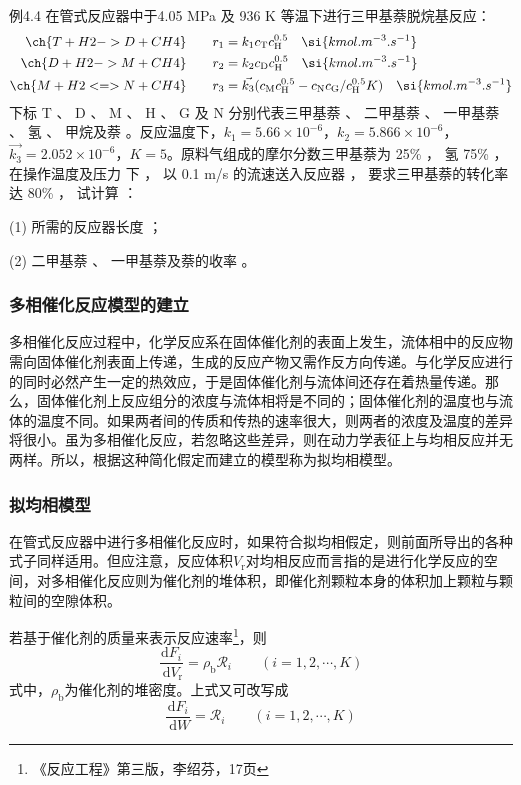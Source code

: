 \documentclass[dvipsnames, svgnames, x11names]{beamer}
\begin{document}
\begin{frame}[t]
    \frametitle{}
    \begin{block}{例4.4}
        在管式反应器中于4.05 MPa 及 936 K 等温下进行三甲基萘脱烷基反应：
        \[
            \begin{aligned}
                \ch{T + H2 -> D + CH4}  \qquad r_1 &= k_1c_\mathrm{T}c_\mathrm{H}^{0.5} \quad \si{kmol.m^{-3}.s^{-1}}\\
                \ch{D + H2 -> M + CH4}  \qquad r_2 &= k_2c_\mathrm{D}c_\mathrm{H}^{0.5} \quad \si{kmol.m^{-3}.s^{-1}}\\
                \ch{M + H2 <=> N + CH4}  \qquad r_3 &= \vec{k_3}(c_\mathrm{M}c_\mathrm{H}^{0.5}-c_\mathrm{N}c_\mathrm{G}/c_\mathrm{H}^{0.5}K) \quad \si{kmol.m^{-3}.s^{-1}}
            \end{aligned}
        \]
        下标 T 、 D 、 M 、 H 、 G 及 N 分别代表三甲基萘 、 二甲基萘 、 一甲基萘 、 氢 、 甲烷及萘 。反应温度下，$k_1=5.66\times 10^{-6}$，$k_2=5.866\times 10^{-6}$，$\vec{k_3}=2.052\times 10^{-6}$，$K=5$。原料气组成的摩尔分数三甲基萘为 25\% ， 氢 75\% ， 在操作温度及压力
        下 ， 以 0.1 m/s 的流速送入反应器 ， 要求三甲基萘的转化率达 80\% ， 试计算 ：
        
        (1) 所需的反应器长度 ；
        
        (2) 二甲基萘 、 一甲基萘及萘的收率 。
    \end{block}
\end{frame}


\begin{frame}
    \frametitle{多相催化反应模型的建立}

    多相催化反应过程中，化学反应系在固体催化剂的表面上发生，流体相中的反应物需向固体催化剂表面上传递，生成的反应产物又需作反方向传递。与化学反应进行的同时必然产生一定的热效应，于是固体催化剂与流体间还存在着热量传递。那么，固体催化剂上反应组分的浓度与流体相将是不同的；固体催化剂的温度也与流体的温度不同。如果两者间的传质和传热的速率很大，则两者的浓度及温度的差异将很小。虽为多相催化反应，若忽略这些差异，则在动力学表征上与均相反应并无两样。所以，根据这种简化假定而建立的模型称为拟均相模型。

\end{frame}


\begin{frame}
    \frametitle{拟均相模型}

    在管式反应器中进行多相催化反应时，如果符合拟均相假定，则前面所导出的各种式子同样适用。但应注意，反应体积$V_\mathrm{r}$对均相反应而言指的是进行化学反应的空间，对多相催化反应则为催化剂的堆体积，即催化剂颗粒本身的体积加上颗粒与颗粒间的空隙体积。
    
    若基于催化剂的质量来表示反应速率\footnote{《反应工程》第三版，李绍芬，17页}，则
    \[
        \frac{\mathrm{d} F_{i}}{\mathrm{~d} V_{\mathrm{r}}}=\rho_\mathrm{b} \mathscr{R}_{i} \qquad(i=1,2, \cdots, K)
    \]
    式中，$\rho_\mathrm{b}$为催化剂的堆密度。上式又可改写成
    \[
        \frac{\mathrm{d} F_{i}}{\mathrm{~d} W}=\mathscr{R}_{i} \qquad(i=1,2, \cdots, K)
    \]

\end{frame}
\end{document}
